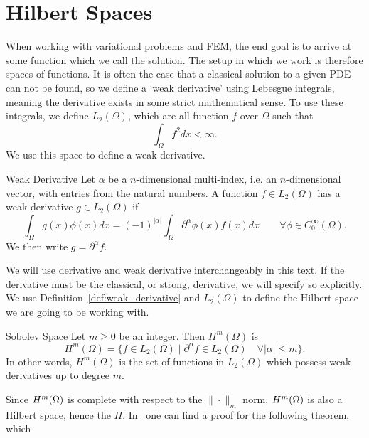 \section{Hilbert Spaces}
When working with variational problems and FEM,
 the end goal is to arrive at some function which we call the solution.
The setup in which we work is therefore spaces of functions. 
It is often the case that a classical solution to a given PDE can 
not be found, 
so we define a `weak derivative' using Lebesgue integrals, meaning 
the derivative exists in some strict mathematical sense. 
To use these integrals, we define $L_2(\Omega)$, which are all 
function $f$ over $\Omega$ such that 
\begin{equation*}
   \int_\Omega f^2 dx < \infty. 
\end{equation*}
We use this space to define a weak derivative.
\begin{defn}{Weak Derivative}
   Let $\alpha$ be a $n$-dimensional multi-index, i.e. an $n$-dimensional vector, 
   with entries from the natural numbers.
    A function $f \in L_2(\Omega)$ has a weak derivative $g \in L_2(\Omega)$
    if
    \begin{equation*}
        \int_\Omega g(x)\phi(x) dx = {(-1)}^{|\alpha|}\int_\Omega 
        \partial ^{\alpha}\phi(x) f(x) dx
        \quad\quad \forall \phi \in C^\infty_0(\Omega).
    \end{equation*}
    We then write $g=\partial ^{\alpha}f$.\label{def:weak_derivative}
\end{defn}
We will use derivative and weak derivative interchangeably in this 
text.
If the derivative must be the classical, or strong, derivative, we will 
specify so explicitly. 
We use Definition~\ref*{def:weak_derivative} and $L_2(\Omega)$ to 
define the Hilbert space we are going to be working with. 
\begin{defn}{Sobolev Space}
   Let $m \geq 0$ be an integer. Then $H^m(\Omega)$ is 
   \begin{equation*}
    H^m(\Omega) = \{  f \in L_2(\Omega) \mid \partial ^{\alpha}f \in 
    L_2(\Omega) \quad \forall |\alpha| \leq m  \}.
   \end{equation*}
   In other words, $H^m(\Omega)$ is the set of functions in $L_2(\Omega)$ 
   which possess weak derivatives up to degree $m$.
\end{defn}
Since $H^m(\Omega)$ is complete with respect to the $\| \cdot\|_m$ norm, 
$H^m(\Omega)$ is also a Hilbert space, hence the $H$.
In~\cite{Brezis} one can find a proof for the following theorem, which 
